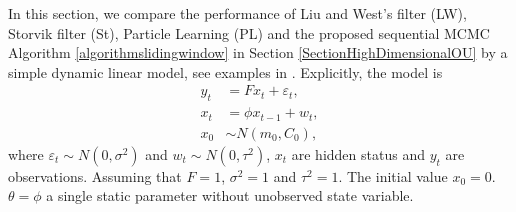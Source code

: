 In this section, we compare the performance of Liu and West's filter (LW), Storvik filter (St), Particle Learning (PL) and the proposed sequential MCMC Algorithm \ref{algorithmslidingwindow} in Section \ref{SectionHighDimensionalOU} by a simple dynamic linear model, see examples in \citep{liu2001combined}. Explicitly, the model is 
\begin{align*}
y_t&=F x_t+\varepsilon_t,\\
x_t&=\phi x_{t-1}+w_t,\\
x_0&\sim N(m_0,C_0),
\end{align*}
where $\varepsilon_t\sim N\left(0,\sigma^2\right)$ and $w_t\sim N\left(0,\tau^2\right)$, $x_t$ are hidden status and $y_t$ are observations. Assuming that $F=1$, $\sigma^2=1$ and $\tau^2=1$. The initial value $x_0=0$. $\theta = \phi$ a single static parameter without unobserved state variable. 

